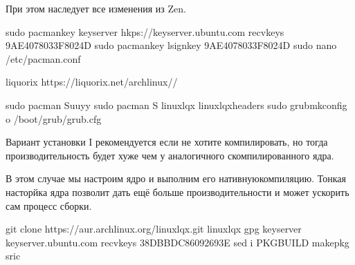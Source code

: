 \documentclass[letterpaper,10pt,russian,openany]{sphinxmanual}
\begin{document}
\sphinxAtStartPar
При этом наследует все изменения из Zen.

\sphinxAtStartPar
{}

\begin{sphinxVerbatim}[commandchars=\\\{\}]
sudo pacman\PYGZhy{}key \PYGZhy{}\PYGZhy{}keyserver hkps://keyserver.ubuntu.com \PYGZhy{}\PYGZhy{}recv\PYGZhy{}keys 9AE4078033F8024D
sudo pacman\PYGZhy{}key \PYGZhy{}\PYGZhy{}lsign\PYGZhy{}key 9AE4078033F8024D      
sudo nano /etc/pacman.conf

\PYG{o}{[}liquorix\PYG{o}{]}
  https://liquorix.net/archlinux//
\end{sphinxVerbatim}

\noindent{}

\begin{sphinxVerbatim}[commandchars=\\\{\}]
sudo pacman \PYGZhy{}Suuyy
sudo pacman \PYGZhy{}S linux\PYGZhy{}lqx linux\PYGZhy{}lqx\PYGZhy{}headers
sudo grub\PYGZhy{}mkconfig \PYGZhy{}o /boot/grub/grub.cfg
\end{sphinxVerbatim}

\sphinxAtStartPar
Вариант установки I рекомендуется если не хотите компилировать,
но тогда производительность будет хуже чем у аналогичного скомпилированного ядра.

\sphinxAtStartPar
{}

\sphinxAtStartPar
В этом случае мы настроим ядро и выполним его нативную\sphinxhyphen{}компиляцию.
Тонкая насторйка ядра позволит дать ещё больше производительности и может
ускорить сам процесс сборки.

\begin{sphinxVerbatim}[commandchars=\\\{\}]
git clone https://aur.archlinux.org/linux\PYGZhy{}lqx.git                 
 linux\PYGZhy{}lqx                                                      
gpg \PYGZhy{}\PYGZhy{}keyserver keyserver.ubuntu.com \PYGZhy{}\PYGZhy{}recv\PYGZhy{}keys 38DBBDC86092693E 
sed \PYGZhy{}i  PKGBUILD                 
makepkg \PYGZhy{}sric
\end{sphinxVerbatim}
\end{document}
